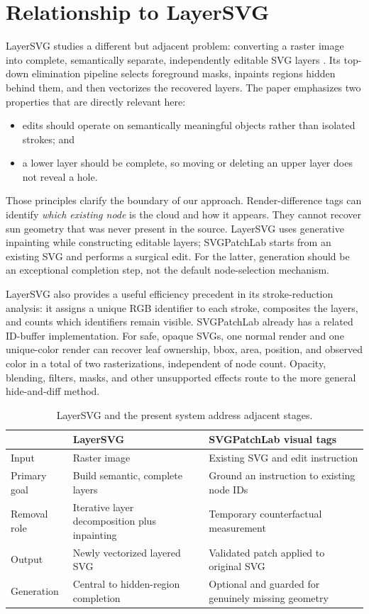 \documentclass[10pt,a4paper]{article}
\begin{document}
\section{Relationship to LayerSVG}

LayerSVG studies a different but adjacent problem: converting a raster image
into complete, semantically separate, independently editable SVG layers
\cite{layersvg}. Its top-down elimination pipeline selects foreground masks,
inpaints regions hidden behind them, and then vectorizes the recovered layers.
The paper emphasizes two properties that are directly relevant here:

\begin{itemize}
  \item edits should operate on semantically meaningful objects rather than
  isolated strokes; and
  \item a lower layer should be complete, so moving or deleting an upper layer
  does not reveal a hole.
\end{itemize}

Those principles clarify the boundary of our approach. Render-difference tags
can identify \emph{which existing node} is the cloud and how it appears. They
cannot recover sun geometry that was never present in the source. LayerSVG uses
generative inpainting while constructing editable layers; SVGPatchLab starts
from an existing SVG and performs a surgical edit. For the latter, generation
should be an exceptional completion step, not the default node-selection
mechanism.

LayerSVG also provides a useful efficiency precedent in its stroke-reduction
analysis: it assigns a unique RGB identifier to each stroke, composites the
layers, and counts which identifiers remain visible. SVGPatchLab already has a
related ID-buffer implementation. For safe, opaque SVGs, one normal render and
one unique-color render can recover leaf ownership, bbox, area, position, and
observed color in a total of two rasterizations, independent of node count.
Opacity, blending, filters, masks, and other unsupported effects route to the
more general hide-and-diff method.

\begin{table}[H]
\centering
\caption{LayerSVG and the present system address adjacent stages.}
\begin{tabularx}{\linewidth}{@{}p{31mm}YY@{}}
\toprule
 & \textbf{LayerSVG} & \textbf{SVGPatchLab visual tags}\\
\midrule
Input & Raster image & Existing SVG and edit instruction\\
Primary goal & Build semantic, complete layers & Ground an instruction to existing node IDs\\
Removal role & Iterative layer decomposition plus inpainting & Temporary counterfactual measurement\\
Output & Newly vectorized layered SVG & Validated patch applied to original SVG\\
Generation & Central to hidden-region completion & Optional and guarded for genuinely missing geometry\\
\bottomrule
\end{tabularx}
\end{table}
\end{document}
